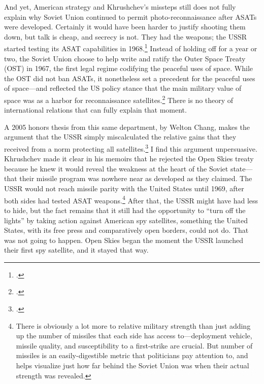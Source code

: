 \documentclass{report}
\begin{document}
And yet, American strategy and Khrushchev's missteps still does not fully explain why Soviet Union continued to permit photo-reconnaissance after ASATs were developed. Certainly it would have been harder to justify shooting them down, but talk is cheap, and secrecy is not. They had the weapons; the USSR started testing its ASAT capabilities in 1968.\footcite[p.~149]{karas_new_1983} Instead of holding off for a year or two, the Soviet Union choose to help write and ratify the Outer Space Treaty (OST) in 1967, the first legal regime codifying the peaceful uses of space. While the OST did not ban ASATs, it nonetheless set a precedent for the peaceful uses of space---and reflected the US policy stance that the main military value of space was as a harbor for reconnaissance satellites.\footcite[p~16]{mowthorpe_militarization_2004} There is no theory of international relations that can fully explain that moment.

A 2005 honors thesis from this same department, by Welton Chang, makes the argument that the USSR simply miscalculated the relative gains that they received from a norm protecting all satellites.\footcite[Welton Chang is now a senior associate at the Center for Strategic and International Studies, and received a Ph.D. in Psychology from the University of Pennsylvania, where he studied judgement and decisionmaking. Professor Valentino provided me with his honors work, and it has been invaluable in shaping my understanding of the politics of satellites and anti-satellite weapons.]{chang_all_2005} I find this argument unpersuasive. Khrushchev made it clear in his memoirs that he rejected the Open Skies treaty because he knew it would reveal the weakness at the heart of the Soviet state---that their missile program was nowhere near as developed as they claimed. The USSR would not reach missile parity with the United States until 1969, after both sides had tested ASAT weapons.\footnote{There is obviously a lot more to relative military strength than just adding up the number of missiles that each side has access to---deployment vehicle, missile quality, and susceptibility to a first-strike are crucial. But number of missiles is an easily-digestible metric that politicians pay attention to, and helps visualize just how far behind the Soviet Union was when their actual strength was revealed.} After that, the USSR might have had less to hide, but the fact remains that it still had the opportunity to ``turn off the lights'' by taking action against American spy satellites, something the United States, with its free press and comparatively open borders, could not do. That was not going to happen. Open Skies began the moment the USSR launched their first spy satellite, and it stayed that way.
\end{document}
